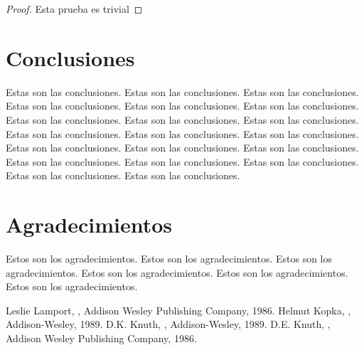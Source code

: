 \documentclass[twocolumn]{maeb2015}
\begin{document}
\begin{proof}
Esta prueba es trivial
\end{proof}

\section{Conclusiones}
Estas son las conclusiones.
Estas son las conclusiones.
Estas son las conclusiones.
Estas son las conclusiones.
Estas son las conclusiones.
Estas son las conclusiones.
Estas son las conclusiones.
Estas son las conclusiones.
Estas son las conclusiones.
Estas son las conclusiones.
Estas son las conclusiones.
Estas son las conclusiones.
Estas son las conclusiones.
Estas son las conclusiones.
Estas son las conclusiones.
Estas son las conclusiones.
Estas son las conclusiones.
Estas son las conclusiones.
Estas son las conclusiones.
Estas son las conclusiones.

\section*{Agradecimientos}
Estos son los agradecimientos.
Estos son los agradecimientos.
Estos son los agradecimientos.
Estos son los agradecimientos.
Estos son los agradecimientos.
Estos son los agradecimientos.

\nocite{*}


\begin{thebibliography}{1}
Leslie Lamport,
,
\newblock Addison Wesley Publishing Company, 1986.
Helmut Kopka,
,
\newblock Addison-Wesley, 1989.
D.K. Knuth,
,
\newblock Addison-Wesley, 1989.
D.E. Knuth,
,
\newblock Addison Wesley Publishing Company, 1986.
\end{thebibliography}
\end{document}

